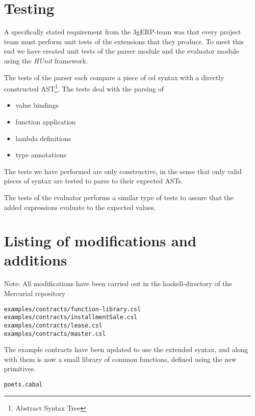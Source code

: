 \documentclass[10pt,a4paper,final,oneside,openany,article]{memoir}
\begin{document}

\section{Testing}
\label{tests}
A specifically stated requirement from the 3gERP-team was that every
project team must perform unit tests of the extensions that they
produce. To meet this end we have created unit tests of the parser
module and the evaluator module using the \emph{HUnit} framework.

The tests of the parser each compare a piece of csl syntax with a
directly constructed AST\footnote{Abstract Syntax Tree}.  The tests
deal with the parsing of

\begin{itemize}
  \item value bindings
  \item function application
  \item lambda definitions
  \item type annotations
\end{itemize}

The tests we have performed are only constructive, in the sense that
only valid pieces of syntax are tested to parse to their expected
ASTs.

The tests of the evaluator performs a similar type of tests to assure
that the added expressions evaluate to the expected values.

\section{Listing of modifications and additions}

Note: All modifications have been carried out in the haskell-directory
of the Mercurial repository

\vspace{2em}
\begin{verbatim}
examples/contracts/function-library.csl
examples/contracts/installmentSale.csl
examples/contracts/lease.csl
examples/contracts/master.csl
\end{verbatim}

The example contracts have been updated to use the extended syntax,
and along with them is now a small library of common functions,
defined using the new primitives.

\vspace{2em}
\begin{verbatim}
poets.cabal
\end{verbatim}
\end{document}
